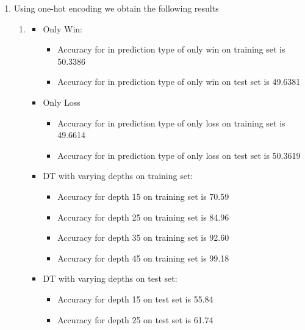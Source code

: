 \begin{enumerate}[label=(\alph*)]
    \item Using one-hot encoding we obtain the following results

          \begin{enumerate}[label=\roman*.]
              \item
                    \begin{itemize}
                        \item Only Win:
                              \begin{itemize}
                                  \item Accuracy for in prediction type of only win on training set is 50.3386
                                  \item Accuracy for in prediction type of only win on test set is 49.6381
                              \end{itemize}
                        \item Only Loss
                              \begin{itemize}
                                  \item Accuracy for in prediction type of only loss on training set is 49.6614
                                  \item Accuracy for in prediction type of only loss on test set is 50.3619
                              \end{itemize}
                        \item DT with varying depths on training set:
                              \begin{itemize}
                                  \item Accuracy for depth 15 on training set is 70.59
                                  \item Accuracy for depth 25 on training set is 84.96
                                  \item Accuracy for depth 35 on training set is 92.60
                                  \item Accuracy for depth 45 on training set is 99.18
                              \end{itemize}
                        \item DT with varying depths on test set:
                              \begin{itemize}
                                  \item Accuracy for depth 15 on test set is 55.84
                                  \item Accuracy for depth 25 on test set is 61.74

\end{itemize}
\end{itemize}
\end{enumerate}
\end{enumerate}

